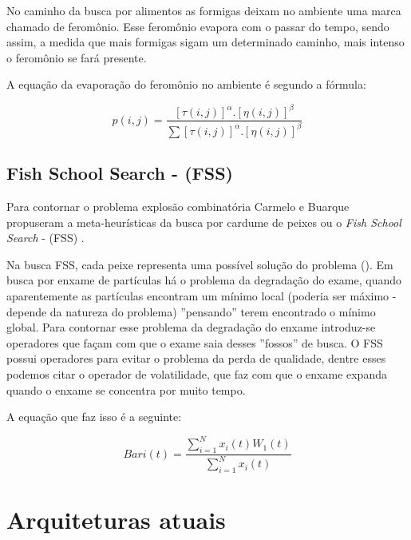 \documentclass[conference,compsoc]{IEEEtran}
\begin{document}
No caminho da busca por alimentos as formigas deixam no ambiente uma marca chamado de feromônio.
Esse feromônio evapora com o passar do tempo, sendo assim, a medida que mais formigas sigam um determinado caminho,
mais intenso o feromônio se fará presente. 

A equação da evaporação do feromônio no ambiente é segundo a fórmula:

\begin{equation}
p(i,j)= \frac{[\tau (i,j)]^{\alpha }.[\eta (i,j)]^{\beta}}{\sum [\tau (i,j)]^{\alpha }.[\eta (i,j)]^{\beta}}
\end{equation}



\subsection{Fish School Search - (FSS) }\label{arte:algo:fss}

Para contornar o problema explosão combinatória Carmelo e Buarque propuseram a meta-heurísticas da busca por cardume de peixes
ou o \textit{Fish School Search} - (FSS) \cite{Filho2008}.

Na busca FSS, cada peixe representa uma possível solução do problema (\cite{Filho2008}).
Em busca por enxame de partículas há o problema da degradação do exame, quando aparentemente as partículas encontram
um mínimo local (poderia ser máximo - depende da natureza do problema) ''pensando'' terem encontrado o mínimo global.
Para contornar esse problema da degradação do enxame introduz-se operadores que façam com que o exame saia desses ''fossos''
de busca.
O FSS possui operadores para evitar o problema da perda de qualidade, dentre esses podemos citar o operador de volatilidade, 
que faz com que o enxame expanda quando o enxame se concentra por muito tempo.

A equação que faz isso é a seguinte:

\begin{equation}
Bari(t) = \frac{\sum_{i=1}^{N}x_i(t)W_1(t)}{\sum_{i=1}^{N}x_i(t)}
\end{equation}



\section{Arquiteturas atuais}
\end{document}
